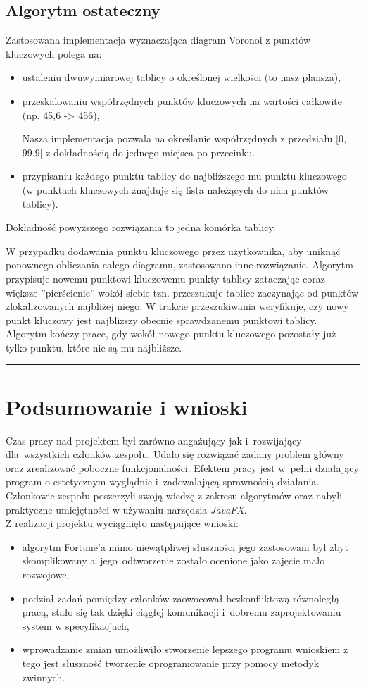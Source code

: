 \documentclass[a4paper,11pt]{article}
\newcommand{\linia}{\rule{\linewidth}{0.4mm}}
\begin{document}
\subsection{Algorytm ostateczny}
Zastosowana implementacja wyznaczająca diagram Voronoi z punktów kluczowych polega na:
\begin{itemize}
\item ustaleniu dwuwymiarowej tablicy o określonej wielkości (to nasz plansza),
\item przeskalowaniu współrzędnych punktów kluczowych na wartości całkowite (np. 45,6 -> 456),
		
		Nasza implementacja pozwala na określanie współrzędnych z przedziału [0, 99.9] z dokładnością do jednego miejsca po przecinku.
\item przypisaniu każdego punktu tablicy do najbliższego mu punktu kluczowego (w punktach kluczowych znajduje się lista należących do nich punktów tablicy).
\end{itemize}

Dokładność powyższego rozwiązania to jedna komórka tablicy.

W przypadku dodawania punktu kluczowego przez użytkownika, aby uniknąć ponownego obliczania całego diagramu, zastosowano inne rozwiązanie. Algorytm przypisuje nowemu punktowi kluczowemu punkty tablicy zataczając coraz większe ''pierścienie'' wokół siebie tzn. przeszukuje tablice zaczynając od punktów zlokalizowanych najbliżej niego. W trakcie przeszukiwania weryfikuje, czy nowy punkt kluczowy jest najbliższy obecnie sprawdzanemu punktowi tablicy. Algorytm kończy prace, gdy wokół nowego punktu kluczowego pozostały już tylko punktu, które nie są mu najbliższe.

\noindent\linia
\section{Podsumowanie i wnioski}
Czas pracy nad projektem był zarówno angażujący jak i~rozwijający dla~wszystkich członków zespołu. Udało się rozwiązać zadany problem główny oraz zrealizować poboczne funkcjonalności. Efektem pracy jest w~pełni działający program o estetycznym wyglądnie i~zadowalającą sprawnością działania. Członkowie zespołu poszerzyli swoją wiedzę z zakresu algorytmów oraz nabyli praktyczne umiejętności w używaniu narzędzia \textit{JavaFX}. \\
\indent Z realizacji projektu wyciągnięto następujące wnioski:
\begin{itemize}
\item algorytm Fortune'a mimo niewątpliwej słuszności jego zastosowani był zbyt skomplikowany a~jego~odtworzenie zostało ocenione jako zajęcie mało rozwojowe,
\item podział zadań pomiędzy członków zaowocował bezkonfliktową równoległą pracą, stało się tak dzięki ciągłej komunikacji i~dobremu zaprojektowaniu system w specyfikacjach,
\item wprowadzanie zmian umożliwiło stworzenie lepszego programu wnioskiem z tego jest słuszność tworzenie oprogramowanie przy pomocy metodyk zwinnych.
\end{itemize}
\end{document}
